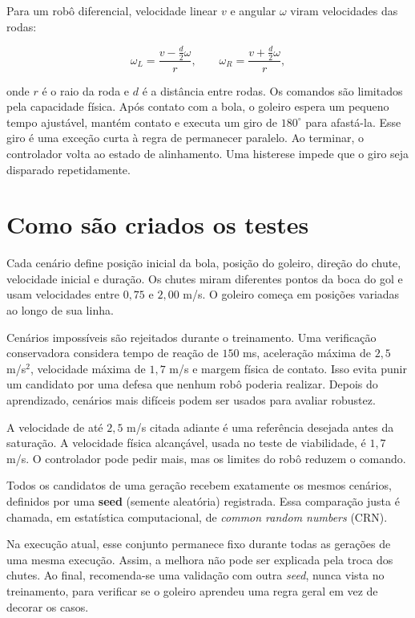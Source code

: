 \documentclass[11pt,a4paper]{article}
\newcommand{\destaque}[1]{\colorbox{cinza}{\parbox{0.94\linewidth}{#1}}}
\newcommand{\termo}[1]{\textbf{\color{azulescuro}#1}}
\begin{document}
Para um robô diferencial, velocidade linear $v$ e angular $\omega$ viram
velocidades das rodas:

\[
 \omega_L=\frac{v-\tfrac{d}{2}\omega}{r},\qquad
 \omega_R=\frac{v+\tfrac{d}{2}\omega}{r},
\]

onde $r$ é o raio da roda e $d$ é a distância entre rodas. Os comandos são
limitados pela capacidade física. Após contato com a bola, o goleiro espera um
pequeno tempo ajustável, mantém contato e executa um giro de $180^\circ$ para
afastá-la. Esse giro é uma exceção curta à regra de permanecer paralelo. Ao
terminar, o controlador volta ao estado de alinhamento. Uma histerese impede
que o giro seja disparado repetidamente.

\section{Como são criados os testes}

Cada cenário define posição inicial da bola, posição do goleiro, direção do
chute, velocidade inicial e duração. Os chutes miram diferentes pontos da boca
do gol e usam velocidades entre $0{,}75$ e $2{,}00$ m/s. O goleiro começa em
posições variadas ao longo de sua linha.

Cenários impossíveis são rejeitados durante o treinamento. Uma verificação
conservadora considera tempo de reação de $150$ ms, aceleração máxima de
$2{,}5$ m/s$^2$, velocidade máxima de $1{,}7$ m/s e margem física de contato.
Isso evita punir um candidato por uma defesa que nenhum robô poderia realizar.
Depois do aprendizado, cenários mais difíceis podem ser usados para avaliar
robustez.

A velocidade de até $2{,}5$ m/s citada adiante é uma referência desejada antes
da saturação. A velocidade física alcançável, usada no teste de viabilidade, é
$1{,}7$ m/s. O controlador pode pedir mais, mas os limites do robô reduzem o
comando.

\destaque{Todos os candidatos de uma geração recebem exatamente os mesmos
cenários, definidos por uma \termo{seed} (semente aleatória) registrada. Essa
comparação justa é chamada, em estatística computacional, de
\emph{common random numbers} (CRN).}

Na execução atual, esse conjunto permanece fixo durante todas as gerações de
uma mesma execução. Assim, a melhora não pode ser explicada pela troca dos
chutes. Ao final, recomenda-se uma validação com outra \emph{seed}, nunca vista no
treinamento, para verificar se o goleiro aprendeu uma regra geral em vez de
decorar os casos.
\end{document}
